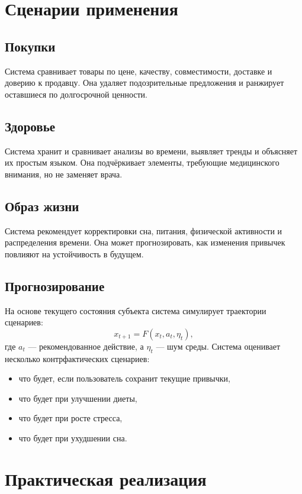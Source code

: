 \documentclass[11pt,a4paper]{article}
\begin{document}
\section{Сценарии применения}

\subsection{Покупки}
Система сравнивает товары по цене, качеству, совместимости, доставке и доверию к продавцу. Она удаляет подозрительные предложения и ранжирует оставшиеся по долгосрочной ценности.

\subsection{Здоровье}
Система хранит и сравнивает анализы во времени, выявляет тренды и объясняет их простым языком. Она подчёркивает элементы, требующие медицинского внимания, но не заменяет врача.

\subsection{Образ жизни}
Система рекомендует корректировки сна, питания, физической активности и распределения времени. Она может прогнозировать, как изменения привычек повлияют на устойчивость в будущем.

\subsection{Прогнозирование}
На основе текущего состояния субъекта система симулирует траектории сценариев:
\[
x_{t+1} = F(x_t, a_t, \eta_t),
\]
где $a_t$ — рекомендованное действие, а $\eta_t$ — шум среды. Система оценивает несколько контрфактических сценариев:
\begin{itemize}[leftmargin=1.2em]
    \item что будет, если пользователь сохранит текущие привычки,
    \item что будет при улучшении диеты,
    \item что будет при росте стресса,
    \item что будет при ухудшении сна.
\end{itemize}

\section{Практическая реализация}
\end{document}
